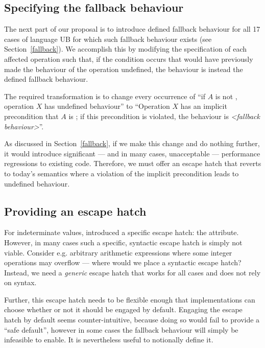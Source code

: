 \subsection{Specifying the fallback behaviour}
\label{specifyfallback}

The next part of our proposal is to introduce defined fallback behaviour for all 17 cases of language UB for which such fallback behaviour exists (see Section~\ref{fallback}). We accomplish this by modifying the specification of each affected operation such that, if the condition occurs that would have previously made the behaviour of the operation undefined, the behaviour is instead the defined fallback behaviour.

The required transformation is to change every occurrence of “if $A$ is not , operation $X$ has undefined behaviour'' to ``Operation $X$ has an implicit precondition that $A$ is ; if this precondition is violated, the behaviour is \emph{<fallback behaviour>}''.

As discussed in Section~\ref{fallback}, if we make this change and do nothing further, it would introduce significant --- and in many cases, unacceptable --- performance regressions to existing code. Therefore, we must offer an escape hatch that reverts to today's semantics where a violation of the implicit precondition leads to undefined behaviour.

\subsection{Providing an escape hatch}
\label{assume}

For indeterminate values, \cite{P2795R5} introduced a specific escape hatch: the \tcode{[[indeterminate]]} attribute. However, in many cases such a specific, syntactic escape hatch is simply not viable. Consider e.g. arbitrary arithmetic expressions where some integer operations may overflow --- where would we place a syntactic escape hatch? Instead, we need a \emph{generic} escape hatch that works for all cases and does not rely on syntax.

Further, this escape hatch needs to be flexible enough that implementations can choose whether or not it should be engaged by default. Engaging the escape hatch by default seems counter-intuitive, because doing so would fail to provide a ``safe default'', however in some cases the fallback behaviour will simply be infeasible to enable. It is nevertheless useful to notionally define it.

